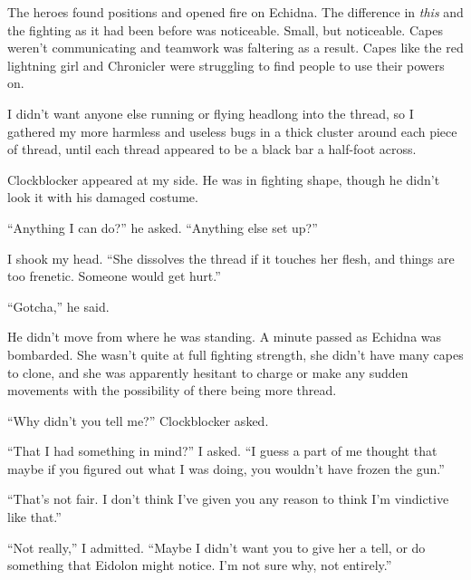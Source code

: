 





The heroes found positions and opened fire on Echidna.  The difference in \emph{this} and the fighting as it had been before was noticeable.  Small, but noticeable.  Capes weren't communicating and teamwork was faltering as a result.  Capes like the red lightning girl and Chronicler were struggling to find people to use their powers on.



I didn't want anyone else running or flying headlong into the thread, so I gathered my more harmless and useless bugs in a thick cluster around each piece of thread, until each thread appeared to be a black bar a half-foot across.



Clockblocker appeared at my side.  He was in fighting shape, though he didn't look it with his damaged costume.



``Anything I can do?'' he asked.  ``Anything else set up?''



I shook my head.  ``She dissolves the thread if it touches her flesh, and things are too frenetic.  Someone would get hurt.''



``Gotcha,'' he said.



He didn't move from where he was standing.  A minute passed as Echidna was bombarded.  She wasn't quite at full fighting strength, she didn't have many capes to clone, and she was apparently hesitant to charge or make any sudden movements with the possibility of there being more thread.



``Why didn't you tell me?''  Clockblocker asked.



``That I had something in mind?'' I asked.  ``I guess a part of me thought that maybe if you figured out what I was doing, you wouldn't have frozen the gun.''



``That's not fair.  I don't think I've given you any reason to think I'm vindictive like that.''



``Not really,'' I admitted.  ``Maybe I didn't want you to give her a tell, or do something that Eidolon might notice.  I'm not sure why, not entirely.''



